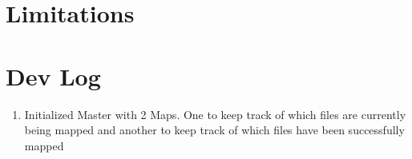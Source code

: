 \documentclass[letterpaper,10pt,english]{sphinxmanual}
\begin{document}
\section{Limitations}
\label{\detokenize{labs/lab2:limitations}}

\section{Dev Log}
\label{\detokenize{labs/lab2:dev-log}}\begin{enumerate}
%
\item {} 
Initialized Master with 2 Maps. One to keep track of which files are currently being mapped and
another to keep track of which files have been successfully mapped

\end{enumerate}
\end{document}
